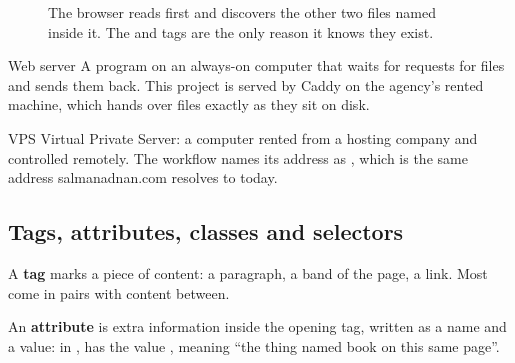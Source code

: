 \documentclass[11pt,a4paper]{article}
\begin{document}
\begin{figure}[H]\centering
{}
\caption{The browser reads  first and discovers the other two
files named inside it. The  and  tags are the only
reason it knows they exist.}
\end{figure}

\begin{jargon}{Web server}
A program on an always-on computer that waits for requests for files and sends
them back. This project is served by Caddy on the agency's rented machine, which
hands over files exactly as they sit on disk.
\end{jargon}

\begin{jargon}{VPS}
Virtual Private Server: a computer rented from a hosting company and controlled
remotely. The workflow names its address as , which is the
same address salmanadnan.com resolves to today.
\end{jargon}

\subsection{Tags, attributes, classes and selectors}

A \textbf{tag} marks a piece of content:  a paragraph, 
a band of the page,  a link. Most come in pairs with content between.

An \textbf{attribute} is extra information inside the opening tag, written as a
name and a value: in ,  has the value
, meaning ``the thing named book on this same page''.
\end{document}
